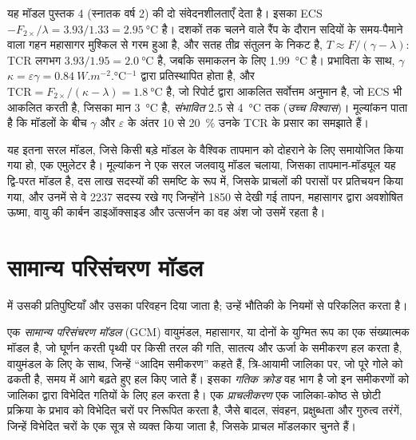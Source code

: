 यह मॉडल पुस्तक 4 (स्नातक वर्ष 2) की दो संवेदनशीलताएँ देता है। इसका ECS
$-F_{2\times}/\lambda = 3.93/1.33 = \qty{2.95}{\celsius}$ है। दशकों तक चलने वाले रैंप के दौरान
सदियों के समय-पैमाने वाला गहन महासागर मुश्किल से गरम हुआ है,
और सतह तीव्र संतुलन के निकट है, $T \approx F/(\gamma -
\lambda)$: TCR लगभग $3.93/1.95 = \qty{2.0}{\celsius}$ है, जबकि
समाकलन के लिए \qty{1.99}{\celsius} है। प्रभाविता के साथ, $\gamma$
$\kappa = \varepsilon\gamma = \qty{0.84}{W.m^{-2}.\celsius^{-1}}$ द्वारा प्रतिस्थापित होता है,
और $\text{TCR} = F_{2\times}/(\kappa - \lambda) = \qty{1.8}{\celsius}$ है, जो
रिपोर्ट द्वारा आकलित सर्वोत्तम अनुमान है, जो ECS भी आकलित करती है, जिसका
मान \qty{3}{\celsius} है, \emph{संभावित} 2.5 से \qty{4}{\celsius} तक (\emph{उच्च
विश्वास})। मूल्यांकन पाता है कि मॉडलों के बीच $\gamma$ और
$\varepsilon$ के अंतर 10 से \qty{20}{\percent}
उनके TCR के प्रसार का समझाते हैं।

यह इतना सरल मॉडल, जिसे किसी बड़े मॉडल के वैश्विक तापमान को दोहराने के लिए समायोजित किया गया हो,
एक एमुलेटर है। मूल्यांकन ने एक सरल जलवायु मॉडल चलाया, जिसका तापमान-मॉड्यूल
यह द्वि-परत मॉडल है, दस लाख सदस्यों की समष्टि के रूप में, जिसके प्राचलों की
परासों पर प्रतिचयन किया गया, और उनमें से वे 2237 सदस्य रखे गए जिन्होंने
1850 से देखी गई तापन, महासागर द्वारा अवशोषित ऊष्मा, वायु की कार्बन डाइऑक्साइड
और उत्सर्जन का वह अंश जो उसमें रहता है।

\section{सामान्य परिसंचरण मॉडल}\label{sec:b3:climate-models:gcm}

 में उसकी प्रतिपुष्टियाँ और उसका परिवहन दिया जाता है;
 उन्हें भौतिकी के नियमों से परिकलित करता है।

\begin{definition}\label{def:b3:climate-models:gcm}
एक \emph{सामान्य परिसंचरण मॉडल} (GCM) वायुमंडल, महासागर, या दोनों के युग्मित रूप का
एक संख्यात्मक मॉडल है, जो घूर्णन करती
पृथ्वी पर किसी तरल की गति, सातत्य और ऊर्जा के समीकरण हल करता है,
वायुमंडल के लिए  के साथ, जिन्हें ``आदिम समीकरण'' कहते हैं,
त्रि-आयामी जालिका पर, जो पूरे गोले को ढकती है,
समय में आगे बढ़ते हुए हल किए जाते हैं। इसका \emph{गतिक
क्रोड} वह भाग है जो इन समीकरणों को
जालिका द्वारा विभेदित गतियों के लिए हल करता है। एक
\emph{प्राचलीकरण} एक जालिका-कोष्ठ से छोटी प्रक्रिया के
प्रभाव को विभेदित चरों पर निरूपित करता है, जैसे बादल,
संवहन, प्रक्षुब्धता और गुरुत्व तरंगें, जिन्हें विभेदित चरों के एक सूत्र से
व्यक्त किया जाता है, जिसके प्राचल मॉडलकार चुनते हैं।
\end{definition}

